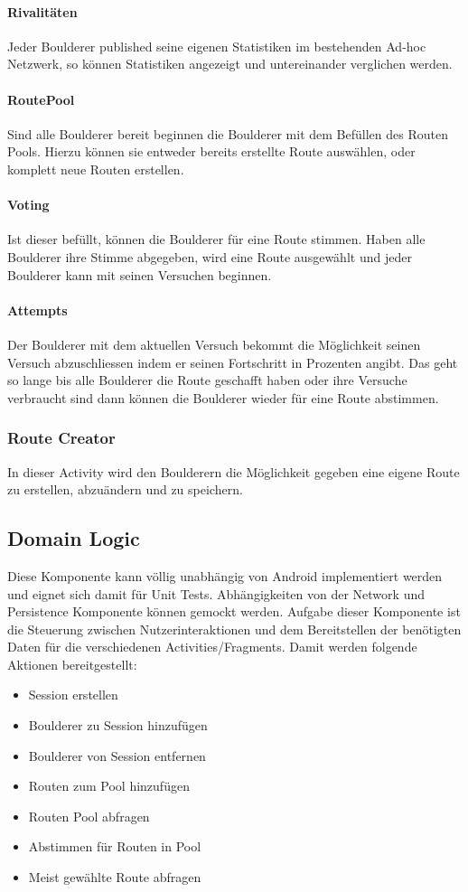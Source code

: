 \documentclass[11pt,a4paper,headsepline,footsepline,bibliography=totocnumbered]{article}
\newcommand{\subsubsubsection}[1]{\paragraph{#1}\mbox{}}
\begin{document}
      \subsubsubsection{Rivalitäten}
        \par
          Jeder Boulderer published seine eigenen Statistiken im bestehenden Ad-hoc Netzwerk, so können Statistiken angezeigt und untereinander verglichen werden.

      \subsubsubsection{RoutePool}
        \par
          Sind alle Boulderer bereit beginnen die Boulderer mit dem Befüllen des Routen Pools.
          Hierzu können sie entweder bereits erstellte Route auswählen, oder komplett neue Routen erstellen.

      \subsubsubsection{Voting}
        \par
          Ist dieser befüllt, können die Boulderer für eine Route stimmen.
          Haben alle Boulderer ihre Stimme abgegeben, wird eine Route ausgewählt und jeder Boulderer kann mit seinen Versuchen beginnen.

      \subsubsubsection{Attempts}
        \par
          Der Boulderer mit dem aktuellen Versuch bekommt die Möglichkeit seinen Versuch abzuschliessen indem er seinen Fortschritt in Prozenten angibt.
          Das geht so lange bis alle Boulderer die Route geschafft haben oder ihre Versuche verbraucht sind dann können die Boulderer wieder für eine Route abstimmen.

    \subsubsection{Route Creator}
      \par
        In dieser Activity wird den Boulderern die Möglichkeit gegeben eine eigene Route zu erstellen, abzuändern und zu speichern.


  \subsection{Domain Logic}
    \par
      Diese Komponente kann völlig unabhängig von Android implementiert werden und eignet sich damit für Unit Tests. Abhängigkeiten von der Network und Persistence Komponente können gemockt werden.
      Aufgabe dieser Komponente ist die Steuerung zwischen Nutzerinteraktionen und dem Bereitstellen der benötigten Daten für die verschiedenen Activities/Fragments.
      Damit werden folgende Aktionen bereitgestellt:
      \begin{itemize}
        \item Session erstellen
        \item Boulderer zu Session hinzufügen
        \item Boulderer von Session entfernen
        \item Routen zum Pool hinzufügen
        \item Routen Pool abfragen
        \item Abstimmen für Routen in Pool
        \item Meist gewählte Route abfragen
      \end{itemize}
\end{document}
